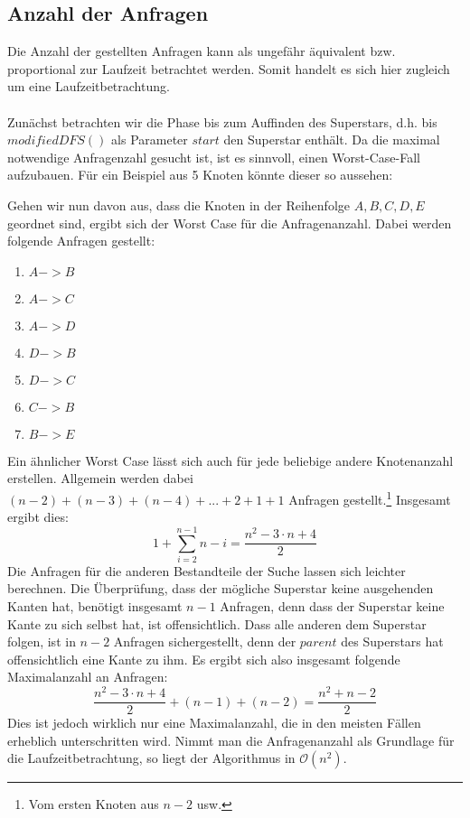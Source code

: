 \documentclass[a4paper, notitlepage, 12pt]{scrartcl}
\begin{document}
\subsection{Anzahl der Anfragen}
Die Anzahl der gestellten Anfragen kann als ungefähr äquivalent bzw. proportional zur Laufzeit betrachtet werden. Somit handelt es sich hier zugleich um eine Laufzeitbetrachtung. \\ \\
Zunächst betrachten wir die Phase bis zum Auffinden des Superstars, d.h. bis $modifiedDFS()$ als Parameter $start$ den Superstar enthält. Da die maximal notwendige Anfragenzahl gesucht ist, ist es sinnvoll, einen Worst-Case-Fall aufzubauen. Für ein Beispiel aus 5 Knoten könnte dieser so aussehen:
\begin{center}
\end{center}
Gehen wir nun davon aus, dass die Knoten in der Reihenfolge ${A,B,C,D,E}$ geordnet sind, ergibt sich der Worst Case für die Anfragenanzahl. Dabei werden folgende Anfragen gestellt:
\begin{enumerate}
  \item $A -> B$
  \item $A -> C$
  \item $A -> D$
  \item $D -> B$
  \item $D -> C$
  \item $C -> B$
  \item $B -> E$
\end{enumerate}
Ein ähnlicher Worst Case lässt sich auch für jede beliebige andere Knotenanzahl erstellen. Allgemein werden dabei $(n - 2) + (n -3) + (n - 4) + ... + 2 + 1 + 1$ Anfragen gestellt.\footnote{Vom ersten Knoten aus $n - 2$ usw.} Insgesamt ergibt dies:
\begin{equation*}
  1 + \sum_{i = 2}^{n - 1} n - i = \frac{n^{2} - 3 \cdot n + 4}{2}
\end{equation*}
Die Anfragen für die anderen Bestandteile der Suche lassen sich leichter berechnen. Die Überprüfung, dass der mögliche Superstar keine ausgehenden Kanten hat, benötigt insgesamt $n - 1$ Anfragen, denn dass der Superstar keine Kante zu sich selbst hat, ist offensichtlich. Dass alle anderen dem Superstar folgen, ist in $n - 2$ Anfragen sichergestellt, denn der $parent$ des Superstars hat offensichtlich eine Kante zu ihm. Es ergibt sich also insgesamt folgende Maximalanzahl an Anfragen:
\begin{equation*}
  \frac{n^{2} - 3 \cdot n + 4}{2} + (n - 1) + (n - 2) = \frac{n^{2} + n - 2}{2}
\end{equation*}
Dies ist jedoch wirklich nur eine Maximalanzahl, die in den meisten Fällen erheblich unterschritten wird. Nimmt man die Anfragenanzahl als Grundlage für die Laufzeitbetrachtung, so liegt der Algorithmus in $\mathcal{O}(n^{2})$.
\end{document}
